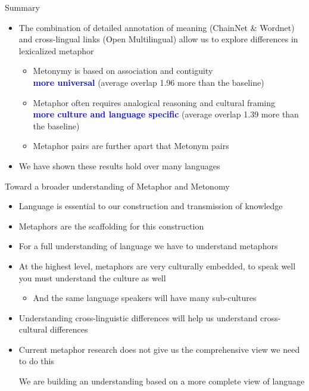 \documentclass[xetex]{beamer}
\newcommand{\txx}[1]{\textbf{\textcolor{blue}{#1}}}
\begin{document}
\begin{frame}{Summary}
  
\begin{itemize}
\item The combination of detailed annotation of meaning (ChainNet \& Wordnet) and
  cross-lingual links (Open Multilingual) allow us to explore differences in lexicalized metaphor
  \begin{itemize}
  \item  Metonymy is based on association and contiguity
    \\ \txx{more universal} (average overlap 1.96 more than the baseline)
  \item  Metaphor often requires analogical reasoning and cultural framing
    \\ \txx{more culture and language specific} (average overlap 1.39 more than the baseline)
  \item Metaphor pairs are further apart that Metonym pairs
  \end{itemize}
\item We have shown these results hold over many languages

\end{itemize}

\end{frame}

\begin{frame}{Toward a broader understanding of Metaphor and Metonomy}
  \begin{itemize}
  \item Language is essential to our construction and transmission of knowledge
  \item Metaphors are the scaffolding for this construction
  \item For a full understanding of language we have to understand metaphors
  \item At the highest level, metaphors are very culturally embedded, to speak well you must understand the culture as well
    \begin{itemize}
    \item And the same language speakers will have many sub-cultures
    \end{itemize}
  \item Understanding cross-linguistic differences will help us understand cross-cultural differences
  \item Current metaphor research does not give us the comprehensive view we need to do this
    \begin{center}
      \large We are building an understanding based on a more complete view of language
    \end{center}
  \end{itemize}
\end{frame}
\end{document}
